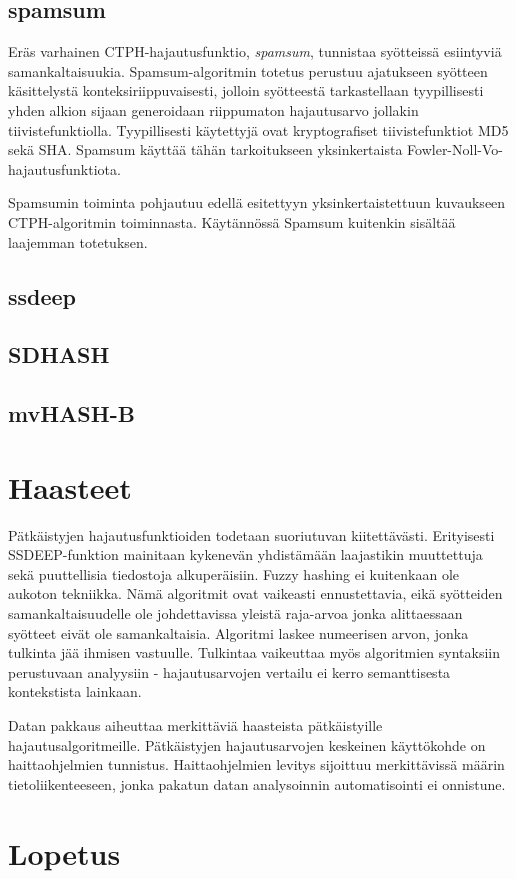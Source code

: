 \documentclass{article}
\begin{document}
	\subsection*{spamsum}

	Eräs varhainen CTPH-hajautusfunktio, \textit{spamsum}, tunnistaa
	syötteissä esiintyviä samankaltaisuukia. Spamsum-algoritmin
	totetus perustuu ajatukseen syötteen käsittelystä konteksiriippuvaisesti,
	jolloin syötteestä tarkastellaan tyypillisesti yhden alkion sijaan
	generoidaan riippumaton hajautusarvo jollakin tiivistefunktiolla. Tyypillisesti käytettyjä ovat kryptografiset tiivistefunktiot MD5 sekä SHA. Spamsum käyttää tähän tarkoitukseen yksinkertaista Fowler-Noll-Vo-hajautusfunktiota.

	Spamsumin toiminta pohjautuu edellä esitettyyn yksinkertaistettuun
	kuvaukseen CTPH-algoritmin toiminnasta. Käytännössä Spamsum kuitenkin
	sisältää laajemman totetuksen.


	\subsection*{ssdeep}
	
	\subsection*{SDHASH}
	
	\subsection*{mvHASH-B}

	\section*{Haasteet}

	Pätkäistyjen hajautusfunktioiden todetaan suoriutuvan kiitettävästi.
	Erityisesti SSDEEP-funktion mainitaan kykenevän yhdistämään laajastikin
	muuttettuja sekä puuttellisia tiedostoja alkuperäisiin. Fuzzy hashing ei
	kuitenkaan ole aukoton tekniikka. Nämä algoritmit ovat vaikeasti
	ennustettavia, eikä syötteiden samankaltaisuudelle ole johdettavissa
	yleistä raja-arvoa jonka alittaessaan syötteet eivät ole samankaltaisia.
	Algoritmi laskee numeerisen arvon, jonka tulkinta jää ihmisen vastuulle.
	Tulkintaa vaikeuttaa myös algoritmien syntaksiin perustuvaan analyysiin -
	hajautusarvojen vertailu ei kerro semanttisesta kontekstista lainkaan.

	Datan pakkaus aiheuttaa merkittäviä haasteista pätkäistyille
	hajautusalgoritmeille. Pätkäistyjen hajautusarvojen keskeinen käyttökohde
	on haittaohjelmien tunnistus. Haittaohjelmien levitys sijoittuu
	merkittävissä määrin tietoliikenteeseen, jonka pakatun datan
	analysoinnin automatisointi ei onnistune.

	\section*{Lopetus}
\end{document}
